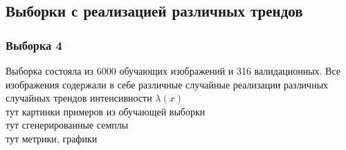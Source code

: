 	\subsection{Выборки с реализацией различных трендов}
		\subsubsection{Выборка 4}
			Выборка состояла из 6000 обучающих изображений и 316 валидационных. Все изображения содержали в себе различные случайные реализации различных случайных трендов интенсивности $\lambda(x)$ \\
			тут картинки примеров из обучающей выборки \\
			тут сгенерированные семплы \\
			тут метрики, графики
